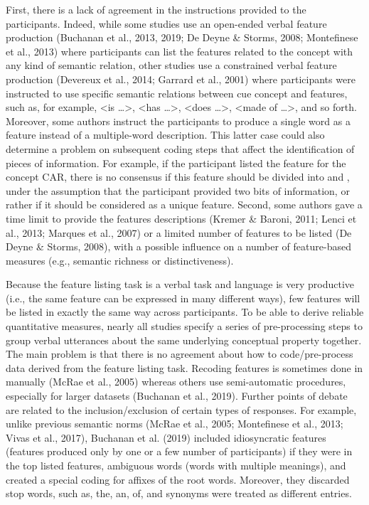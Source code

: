 \documentclass[man]{apa6}
\begin{document}
First, there is a lack of agreement in the instructions provided to the participants. Indeed, while some studies use an open-ended verbal feature production (Buchanan et al., 2013, 2019; De Deyne \& Storms, 2008; Montefinese et al., 2013) where participants can list the features related to the concept with any kind of semantic relation, other studies use a constrained verbal feature production (Devereux et al., 2014; Garrard et al., 2001) where participants were instructed to use specific semantic relations between cue concept and features, such as, for example, \textless{}is \ldots{}\textgreater{}, \textless{}has \ldots{}\textgreater{}, \textless{}does \ldots{}\textgreater{}, \textless{}made of \ldots{}\textgreater{}, and so forth. Moreover, some authors instruct the participants to produce a single word as a feature instead of a multiple-word description. This latter case could also determine a problem on subsequent coding steps that affect the identification of pieces of information. For example, if the participant listed the feature for the concept CAR, there is no consensus if this feature should be divided into and , under the assumption that the participant provided two bits of information, or rather if it should be considered as a unique feature. Second, some authors gave a time limit to provide the features descriptions (Kremer \& Baroni, 2011; Lenci et al., 2013; Marques et al., 2007) or a limited number of features to be listed (De Deyne \& Storms, 2008), with a possible influence on a number of feature-based measures (e.g., semantic richness or distinctiveness).

Because the feature listing task is a verbal task and language is very productive (i.e., the same feature can be expressed in many different ways), few features will be listed in exactly the same way across participants. To be able to derive reliable quantitative measures, nearly all studies specify a series of pre-processing steps to group verbal utterances about the same underlying conceptual property together. The main problem is that there is no agreement about how to code/pre-process data derived from the feature listing task. Recoding features is sometimes done in manually (McRae et al., 2005) whereas others use semi-automatic procedures, especially for larger datasets (Buchanan et al., 2019). Further points of debate are related to the inclusion/exclusion of certain types of responses. For example, unlike previous semantic norms (McRae et al., 2005; Montefinese et al., 2013; Vivas et al., 2017), Buchanan et al. (2019) included idiosyncratic features (features produced only by one or a few number of participants) if they were in the top listed features, ambiguous words (words with multiple meanings), and created a special coding for affixes of the root words. Moreover, they discarded stop words, such as, the, an, of, and synonyms were treated as different entries.
\end{document}
